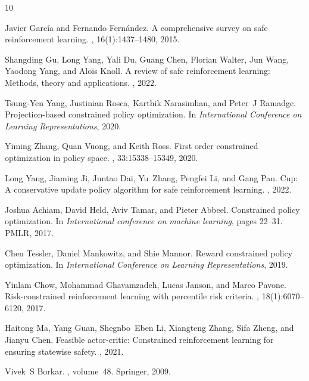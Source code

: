 \documentclass{article}
\theoremstyle{definition}
\begin{document}
\begin{thebibliography}{10}

Javier Garc{\'i}a and Fernando Fern{\'a}ndez.
\newblock A comprehensive survey on safe reinforcement learning.
, 16(1):1437--1480, 2015.

Shangding Gu, Long Yang, Yali Du, Guang Chen, Florian Walter, Jun Wang, Yaodong Yang, and Alois Knoll.
\newblock A review of safe reinforcement learning: Methods, theory and applications.
, 2022.

Tsung-Yen Yang, Justinian Rosca, Karthik Narasimhan, and Peter~J Ramadge.
\newblock Projection-based constrained policy optimization.
\newblock In {\em International Conference on Learning Representations}, 2020.

Yiming Zhang, Quan Vuong, and Keith Ross.
\newblock First order constrained optimization in policy space.
, 33:15338--15349, 2020.

Long Yang, Jiaming Ji, Juntao Dai, Yu~Zhang, Pengfei Li, and Gang Pan.
\newblock Cup: A conservative update policy algorithm for safe reinforcement learning.
, 2022.

Joshua Achiam, David Held, Aviv Tamar, and Pieter Abbeel.
\newblock Constrained policy optimization.
\newblock In {\em International conference on machine learning}, pages 22--31. PMLR, 2017.

Chen Tessler, Daniel Mankowitz, and Shie Mannor.
\newblock Reward constrained policy optimization.
\newblock In {\em International Conference on Learning Representations}, 2019.

Yinlam Chow, Mohammad Ghavamzadeh, Lucas Janson, and Marco Pavone.
\newblock Risk-constrained reinforcement learning with percentile risk criteria.
, 18(1):6070--6120, 2017.

Haitong Ma, Yang Guan, Shegnbo~Eben Li, Xiangteng Zhang, Sifa Zheng, and Jianyu Chen.
\newblock Feasible actor-critic: Constrained reinforcement learning for ensuring statewise safety.
, 2021.

Vivek~S Borkar.
, volume~48.
\newblock Springer, 2009.


\end{thebibliography}
\end{document}
